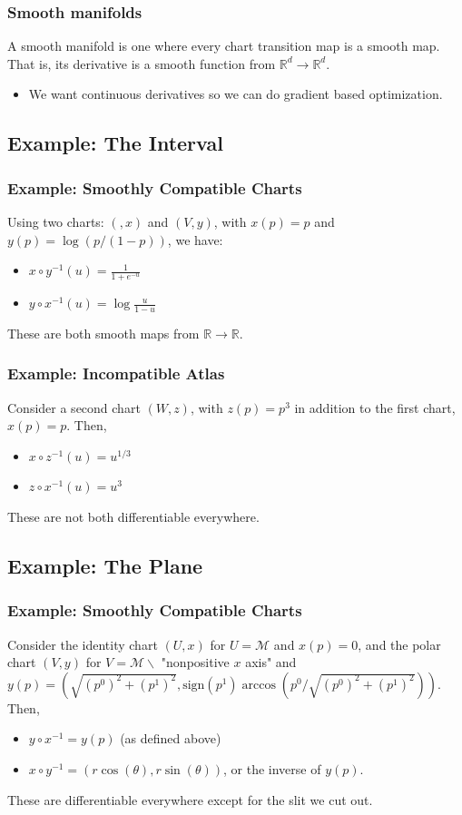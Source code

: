 \documentclass[10pt]{article}
\newcommand{\R}{\mathbb{R}}
\begin{document}
\subsubsection*{Smooth manifolds}
A smooth manifold is one where every chart transition map is a smooth map.  That is, its derivative is a smooth function from $\R^d \rightarrow \R^d$.
\begin{itemize}
    \item We want continuous derivatives so we can do gradient based optimization.
\end{itemize}

\subsection*{Example: The Interval}
\subsubsection*{Example: Smoothly Compatible Charts}
Using two charts: $(, x)$ and $(V, y)$, with $x(p) = p$ and $y(p) = \log(p / (1 - p))$, we have:
\begin{itemize}
    \item $x \circ y^{-1}(u) = \frac{1}{1 + e^{-u}}$ 
    \item $y \circ x^{-1}(u) = \log \frac{u}{1 - u}$
\end{itemize}
These are both smooth maps from $\R \rightarrow \R$.

\subsubsection*{Example: Incompatible Atlas}
Consider a second chart $(W, z)$, with $z(p) = p^3$ in addition to the first chart, $x(p) = p$.  Then,
\begin{itemize}
    \item $x \circ z^{-1}(u) = u^{1/3}$
    \item $z \circ x^{-1}(u) = u^3$
\end{itemize}
These are not both differentiable everywhere.

\subsection*{Example: The Plane}
\subsubsection*{Example: Smoothly Compatible Charts}
Consider the identity chart $(U, x)$ for $U = \mathcal{M}$ and $x(p) = 0$, and the polar chart $(V, y)$ for $V = \mathcal{M} \backslash$ "nonpositive $x$ axis" and $y(p) = \left(\sqrt{(p^0)^2 + (p^1)^2}, \text{sign}(p^1) \arccos(p^0 / \sqrt{(p^0)^2 + (p^1)^2})\right)$.  Then,
\begin{itemize}
    \item $y \circ x^{-1} = y(p)$ (as defined above)
    \item $x \circ y^{-1} = (r \cos(\theta), r \sin(\theta))$, or the inverse of $y(p)$.
\end{itemize}
These are differentiable everywhere except for the slit we cut out.
\end{document}
